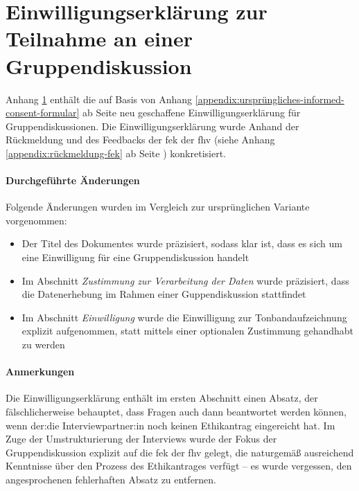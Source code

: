 \documentclass[a4paper,12pt,twoside]{scrreprt}
\begin{document}


\chapter{Einwilligungserklärung zur Teilnahme an einer Gruppendiskussion}
\label{appendix:informed-consent-gruppendiskussion}

Anhang \ref{appendix:informed-consent-gruppendiskussion} enthält die auf Basis von Anhang \ref{appendix:ursprüngliches-informed-consent-formular} ab Seite \pageref{appendix:ursprüngliches-informed-consent-formular} neu geschaffene Einwilligungserklärung für Gruppendiskussionen. Die Einwilligungserklärung wurde Anhand der Rückmeldung und des Feedbacks der \acl{fek} der \acl{fhv} (siehe Anhang \ref{appendix:rückmeldung-fek} ab Seite \pageref{appendix:rückmeldung-fek}) konkretisiert.

\subsubsection*{Durchgeführte Änderungen}
\label{appendix:änderungen-informed-consent-gruppendiskussion}

Folgende Änderungen wurden im Vergleich zur ursprünglichen Variante vorgenommen:
\begin{itemize}
    \item Der Titel des Dokumentes wurde präzisiert, sodass klar ist, dass es sich um eine Einwilligung für eine Gruppendiskussion handelt
    \item Im Abschnitt \textit{Zustimmung zur Verarbeitung der Daten} wurde präzisiert, dass die Datenerhebung im Rahmen einer Guppendiskussion stattfindet
    \item Im Abschnitt \textit{Einwilligung} wurde die Einwilligung zur Tonbandaufzeichnung explizit aufgenommen, statt mittels einer optionalen Zustimmung gehandhabt zu werden
\end{itemize}

\subsubsection*{Anmerkungen}
\label{appendix:anmerkungen-informed-consent-gruppendiskussion}

Die Einwilligungserklärung enthält im ersten Abschnitt einen Absatz, der fälschlicherweise behauptet, dass Fragen auch dann beantwortet werden können, wenn der:die Interviewpartner:in noch keinen Ethikantrag eingereicht hat. Im Zuge der Umstrukturierung der Interviews wurde der Fokus der Gruppendiskussion explizit auf die \acl{fek} der \acl{fhv} gelegt, die naturgemäß ausreichend Kenntnisse über den Prozess des Ethikantrages verfügt -- es wurde vergessen, den angesprochenen fehlerhaften Absatz zu entfernen.
\end{document}

